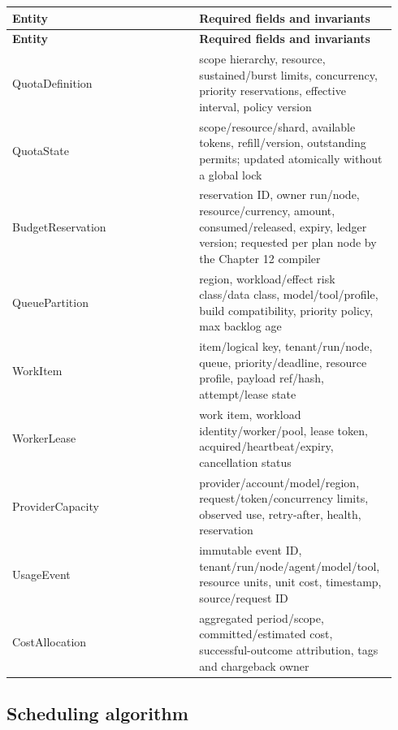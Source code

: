 \BookTableStart
\small
\begin{longtable}{@{}Y{0.4700\linewidth}Y{0.4700\linewidth}@{}}
\color{white}\bfseries \textbf{Entity} & \color{white}\bfseries \textbf{Required fields and invariants} \\
\endfirsthead
{}
\color{white}\bfseries \textbf{Entity} & \color{white}\bfseries \textbf{Required fields and invariants} \\
\endhead
QuotaDefinition & scope hierarchy, resource, sustained/burst limits, concurrency, priority reservations, effective interval, policy version \\
QuotaState & scope/resource/shard, available tokens, refill/version, outstanding permits; updated atomically without a global lock \\
BudgetReservation & reservation ID, owner run/node, resource/currency, amount, consumed/released, expiry, ledger version; requested per plan node by the Chapter 12 compiler \\
QueuePartition & region, workload/effect risk class/data class, model/tool/profile, build compatibility, priority policy, max backlog age \\
WorkItem & item/logical key, tenant/run/node, queue, priority/deadline, resource profile, payload ref/hash, attempt/lease state \\
WorkerLease & work item, workload identity/worker/pool, lease token, acquired/heartbeat/expiry, cancellation status \\
ProviderCapacity & provider/account/model/region, request/token/concurrency limits, observed use, retry-after, health, reservation \\
UsageEvent & immutable event ID, tenant/run/node/agent/model/tool, resource units, unit cost, timestamp, source/request ID \\
CostAllocation & aggregated period/scope, committed/estimated cost, successful-outcome attribution, tags and chargeback owner \\
\end{longtable}
\BookTableEnd

\subsection{Scheduling algorithm}


